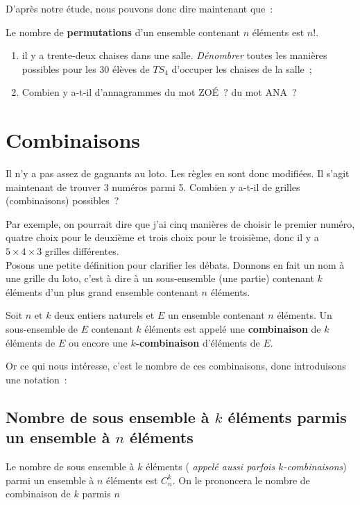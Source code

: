 \documentclass[french]{book}
\newcommand{\co}[2]{C_#2^#1}
\begin{document}
D'après notre étude, nous pouvons donc dire maintenant que~:


\begin{thm}
  Le nombre de \textbf{permutations} d'un ensemble contenant $n$ éléments est $n!$.
\end{thm}


\begin{exemple}[]
  \begin{enumerate}
  \item il y a trente-deux chaises dans une salle.
\textit{Dénombrer} toutes les manières possibles pour les 30 élèves
de $TS_4$ d'occuper les chaises de la salle~;
\item Combien y a-t-il d'annagrammes du mot ZO\'E~? du mot ANA~?
  \end{enumerate}
\end{exemple}


\section{Combinaisons}

Il n'y a pas assez de gagnants au loto. Les règles en sont donc
modifiées. Il s'agit maintenant de trouver 3 numéros parmi 5.
Combien y a-t-il de grilles (combinaisons) possibles~?

Par exemple, on pourrait dire que j'ai cinq manières de choisir le
premier numéro, quatre choix pour le deuxième et trois choix pour
le troisième, donc il y a $5\times 4\times 3$ grilles différentes.\\

Posons une petite définition pour clarifier les débats. Donnons en
fait un nom à une grille du loto, c'est à dire à un sous-ensemble
(une partie) contenant $k$ éléments d'un plus grand ensemble
contenant $n$ éléments.

\begin{defn}[combinaison]
  Soit $n$ et $k$ deux entiers naturels et $E$ un ensemble contenant $n$ éléments. Un sous-ensemble de $E$ contenant $k$
éléments est appelé une \textbf{combinaison} de $k$ éléments de $E$ ou encore une $k$\textbf{-combinaison} d'éléments de
\unboldmath${E}$.
\end{defn}


Or ce qui nous intéresse, c'est le nombre de ces combinaisons,
donc introduisons une notation~:
\subsection{Nombre de sous ensemble à $k$ éléments parmis un ensemble à $n$ éléments}
\begin{defn}
   Le nombre de sous ensemble à $k$ éléments (\textit{ appelé aussi parfois $k$-combinaisons}) parmi un ensemble à $n$ éléments est $\co{k}{n}$. On le prononcera le nombre de combinaison de $k$ parmis $n$
  \vspace{3mm}
\end{defn}
\end{document}

